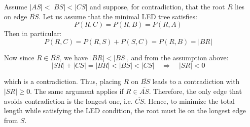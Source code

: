 \documentclass[12pt]{article}
\newcommand{\Prize}[2]{P(#1,#2)}
\begin{document}
	Assume \( |AS| < |BS| < |CS| \) and suppose, for contradiction, that the root \( R \) lies on edge \( \overline{BS} \).  
	Let us assume that the minimal LED tree satisfies:
	\[
	\Prize{R}{C} = \Prize{R}{B} = \Prize{R}{A}
	\]
	Then in particular:
	\[
	\Prize{R}{C} = \Prize{R}{S} + \Prize{S}{C} = \Prize{R}{B} = |BR|
	\]
	
	Now since \( R \in \overline{BS} \), we have \( |BR| < |BS| \), and from the assumption above:
	\[
	|SR| + |CS| = |BR| < |BS| < |CS|
	\quad \Rightarrow \quad |SR| < 0
	\]
	
	which is a contradiction.  
	Thus, placing \( R \) on \( \overline{BS} \) leads to a contradiction with \( |SR| \geq 0 \).  
	The same argument applies if \( R \in \overline{AS} \).  
	Therefore, the only edge that avoids contradiction is the longest one, i.e. \( \overline{CS} \).  
	Hence, to minimize the total length while satisfying the LED condition, the root must lie on the longest edge from \( S \).
	
	
	
\end{document}
